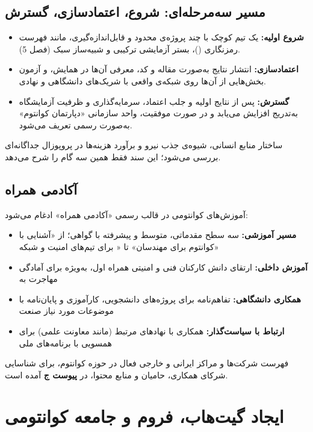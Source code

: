 \documentclass[a4paper,12pt]{article}
\begin{document}
	\subsection{مسیر سه‌مرحله‌ای: شروع، اعتمادسازی، گسترش}
	\begin{itemize}[rightmargin=0.5cm, itemsep=4pt]
		\item \textbf{شروع اولیه:} یک تیم کوچک با چند پروژه‌ی محدود و قابل‌اندازه‌گیری، مانند فهرست رمزنگاری ()، بستر آزمایشی  ترکیبی و شبیه‌ساز سبک  (فصل 5).
		\item \textbf{اعتمادسازی:} انتشار نتایج به‌صورت مقاله و کد، معرفی آن‌ها در همایش، و آزمون بخش‌هایی از آن‌ها روی شبکه‌ی واقعی با شریک‌های دانشگاهی و نهادی.
		\item \textbf{گسترش:} پس از نتایج اولیه و جلب اعتماد، سرمایه‌گذاری و ظرفیت آزمایشگاه به‌تدریج افزایش می‌یابد و در صورت موفقیت، واحد سازمانی «دپارتمان کوانتوم» به‌صورت رسمی تعریف می‌شود.
	\end{itemize}
	ساختار منابع انسانی، شیوه‌ی جذب نیرو و برآورد هزینه‌ها در پروپوزال جداگانه‌ای بررسی می‌شود؛ این سند فقط همین سه گام را شرح می‌دهد.

	\subsection{آکادمی همراه}
	آموزش‌های کوانتومی در قالب رسمی «آکادمی همراه» ادغام می‌شود:
	\begin{itemize}[rightmargin=0.5cm, itemsep=4pt]
		\item \textbf{مسیر آموزشی:} سه سطح مقدماتی، متوسط و پیشرفته با گواهی؛ از «آشنایی با کوانتوم برای مهندسان» تا « برای تیم‌های امنیت و شبکه»
		\item \textbf{آموزش داخلی:} ارتقای دانش کارکنان فنی و امنیتی همراه اول، به‌ویژه برای آمادگی مهاجرت به 
		\item \textbf{همکاری دانشگاهی:} تفاهم‌نامه برای پروژه‌های دانشجویی، کارآموزی و پایان‌نامه با موضوعات مورد نیاز صنعت
		\item \textbf{ارتباط با سیاست‌گذار:} همکاری با نهادهای مرتبط (مانند معاونت علمی) برای همسویی با برنامه‌های ملی
	\end{itemize}

	فهرست شرکت‌ها و مراکز ایرانی و خارجی فعال در حوزه کوانتوم، برای شناسایی شرکای همکاری، حامیان و منابع محتوا، در \textbf{پیوست ج} آمده است.

	\section{ایجاد گیت‌هاب، فروم و جامعه کوانتومی}
\end{document}
